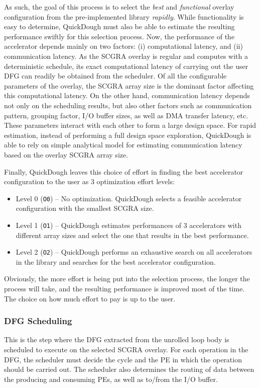 As such, the goal of this process is to select the \emph{best} and \emph{functional} overlay configuration from the pre-implemented library \emph{rapidly}.
While functionality is easy to determine, QuickDough must also be able to estimate the resulting performance swiftly for this selection process.
Now, the performance of the accelerator depends mainly on two factors: (i) computational latency, and (ii) communication latency.
As the SCGRA overlay is regular and computes with a deterministic schedule, its exact computational latency of carrying out the user DFG can readily be obtained from the scheduler.
Of all the configurable parameters of the overlay, the SCGRA array size is the dominant factor affecting this computational latency.
On the other hand, communication latency depends not only on the scheduling results, but also other factors such as communication pattern, grouping factor, I/O buffer sizes, as well as DMA transfer latency, etc.
These parameters interact with each other to form a large design space.
For rapid estimation, instead of performing a full design space exploration, QuickDough is able to rely on simple analytical model for estimating communication latency based on the overlay SCGRA array size.

Finally, QuickDough leaves this choice of effort in finding the best accelerator configuration to the user as 3 optimization effort levels:
\begin{itemize}[nosep]
\item Level 0 (\texttt{O0}) -- No optimization.  QuickDough selects a feasible accelerator configuration with the smallest SCGRA size.
\item Level 1 (\texttt{O1}) -- QuickDough estimates performances of 3 accelerators with different array sizes and select the one that results in the best performance.
\item Level 2 (\texttt{O2}) -- QuickDough performs an exhaustive search on all accelerators in the library and searches for the best accelerator configuration. 
\end{itemize}

Obviously, the more effort is being put into the selection process, the longer the process will take, and the resulting performance is improved most of the time.
The choice on how much effort to pay is up to the user.

\subsubsection{DFG Scheduling}
This is the step where the DFG extracted from the unrolled loop body is scheduled to execute on the selected SCGRA overlay.
For each operation in the DFG, the scheduler must decide the cycle and the PE in which the operation should be carried out.
The scheduler also determines the routing of data between the producing and consuming PEs, as well as to/from the I/O buffer.

